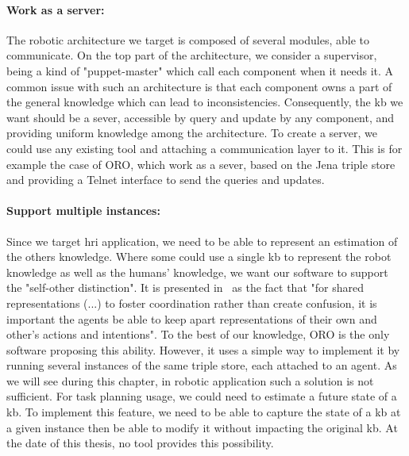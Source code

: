 \paragraph{Work as a server:} The robotic architecture we target is composed of several modules, able to communicate. On the top part of the architecture, we consider a supervisor, being a kind of "puppet-master" which call each component when it needs it. A common issue with such an architecture is that each component owns a part of the general knowledge which can lead to inconsistencies. Consequently, the \acrlong{kb} we want should be a sever, accessible by query and update by any component, and providing uniform knowledge among the architecture. To create a server, we could use any existing tool and attaching a communication layer to it. This is for example the case of ORO, which work as a sever, based on the Jena triple store and providing a Telnet interface to send the queries and updates.

\paragraph{Support multiple instances:} Since we target \acrshort{hri} application, we need to be able to represent an estimation of the others knowledge. Where some could use a single \acrlong{kb} to represent the robot knowledge as well as the humans' knowledge, we want our software to support the "self-other distinction". It is presented in~\cite{pacherie_2012_phenomenology} as the fact that "for shared representations (...) to foster coordination rather than create confusion, it is important the agents be able to keep apart representations of their own and other's actions and intentions". To the best of our knowledge, ORO is the only software proposing this ability. However, it uses a simple way to implement it by running several instances of the same triple store, each attached to an agent. As we will see during this chapter, in robotic application such a solution is not sufficient. For task planning usage, we could need to estimate a future state of a \acrshort{kb}. To implement this feature, we need to be able to capture the state of a \acrshort{kb} at a given instance then be able to modify it without impacting the original \acrshort{kb}. At the date of this thesis, no tool provides this possibility.

